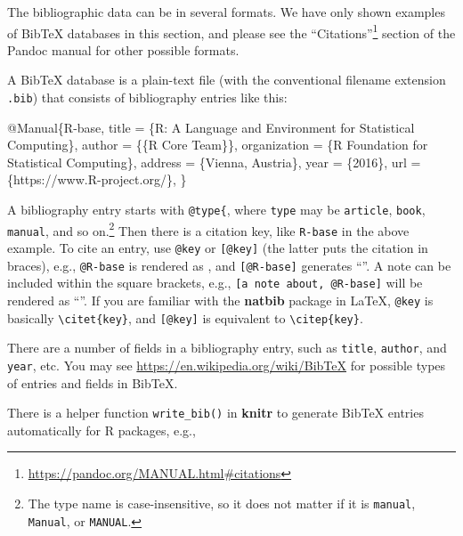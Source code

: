 \documentclass[
  12pt,
]{krantz}
\newenvironment{Shaded}{\begin{snugshade}}{\end{snugshade}}
\newcommand{\DataTypeTok}[1]{\textcolor[rgb]{0.13,0.29,0.53}{#1}}
\newcommand{\NormalTok}[1]{#1}
\newcommand{\OtherTok}[1]{\textcolor[rgb]{0.56,0.35,0.01}{#1}}
\newcommand{\VariableTok}[1]{\textcolor[rgb]{0.00,0.00,0.00}{#1}}
\renewcommand{\href}[2]{#2\footnote{\url{#1}}}
\theoremstyle{definition}
\theoremstyle{definition}
\theoremstyle{definition}
\theoremstyle{definition}
\theoremstyle{remark}
\begin{document}
The bibliographic data can be in several formats. We have only shown examples of BibTeX databases in this section, and please see the \href{https://pandoc.org/MANUAL.html\#citations}{``Citations''} section of the Pandoc manual for other possible formats.

A BibTeX database is a plain-text file (with the conventional filename extension \texttt{.bib}) that consists of bibliography entries like this:

\begin{Shaded}
\begin{Highlighting}[]
\VariableTok{@Manual}\NormalTok{\{}\OtherTok{R}\NormalTok{{-}}\OtherTok{base}\NormalTok{,}
  \DataTypeTok{title}\NormalTok{ = \{R: A Language and Environment for Statistical}
\NormalTok{    Computing\},}
  \DataTypeTok{author}\NormalTok{ = \{\{R Core Team\}\},}
  \DataTypeTok{organization}\NormalTok{ = \{R Foundation for Statistical Computing\},}
  \DataTypeTok{address}\NormalTok{ = \{Vienna, Austria\},}
  \DataTypeTok{year}\NormalTok{ = \{2016\},}
  \DataTypeTok{url}\NormalTok{ = \{https://www.R{-}project.org/\},}
\NormalTok{\}}
\end{Highlighting}
\end{Shaded}

A bibliography entry starts with \texttt{@type\{}, where \texttt{type} may be \texttt{article}, \texttt{book}, \texttt{manual}, and so on.\footnote{The type name is case-insensitive, so it does not matter if it is \texttt{manual}, \texttt{Manual}, or \texttt{MANUAL}.} Then there is a citation key, like \texttt{R-base} in the above example. To cite an entry, use \texttt{@key} or \texttt{{[}@key{]}} (the latter puts the citation in braces), e.g., \texttt{@R-base} is rendered as \citet{R-base}, and \texttt{{[}@R-base{]}} generates ``\citep{R-base}''. A note can be included within the square brackets, e.g., \texttt{{[}a\ note\ about,\ @R-base{]}} will be rendered as ``\citep[a note about,][]{R-base}''. If you are familiar with the \textbf{natbib} package in LaTeX, \texttt{@key} is basically \texttt{\textbackslash{}citet\{key\}}, and \texttt{{[}@key{]}} is equivalent to \texttt{\textbackslash{}citep\{key\}}.

There are a number of fields in a bibliography entry, such as \texttt{title}, \texttt{author}, and \texttt{year}, etc. You may see \url{https://en.wikipedia.org/wiki/BibTeX} for possible types of entries and fields in BibTeX.

There is a helper function \texttt{write\_bib()} in \textbf{knitr} to generate BibTeX entries automatically for R packages, e.g.,
\end{document}
